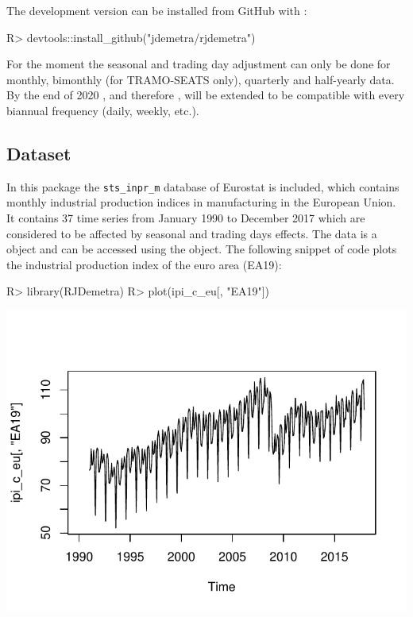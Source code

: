 \documentclass[article]{jss}
\begin{document}
The development version can be installed from GitHub with 
\citep{devtools}:

\begin{CodeChunk}

\begin{CodeInput}
R> devtools::install_github("jdemetra/rjdemetra")
\end{CodeInput}
\end{CodeChunk}

For the moment the seasonal and trading day adjustment can only be done
for monthly, bimonthly (for TRAMO-SEATS only), quarterly and half-yearly
data. By the end of 2020 , and therefore
, will be extended to be compatible with every biannual
frequency (daily, weekly, etc.).

\hypertarget{dataset}{%
\subsection{Dataset}\label{dataset}}

In this package the \texttt{sts\_inpr\_m} database of Eurostat is
included, which contains monthly industrial production indices in
manufacturing in the European Union. It contains 37 time series from
January 1990 to December 2017 which are considered to be affected by
seasonal and trading days effects. The data is a  object and
can be accessed using the  object. The following snippet
of code plots the industrial production index of the euro area (EA19):

\begin{CodeChunk}

\begin{CodeInput}
R> library(RJDemetra)
R> plot(ipi_c_eu[, "EA19"])
\end{CodeInput}


\begin{center}\includegraphics{img/img-basic_raw_data_plot-1} \end{center}

\end{CodeChunk}
\end{document}
